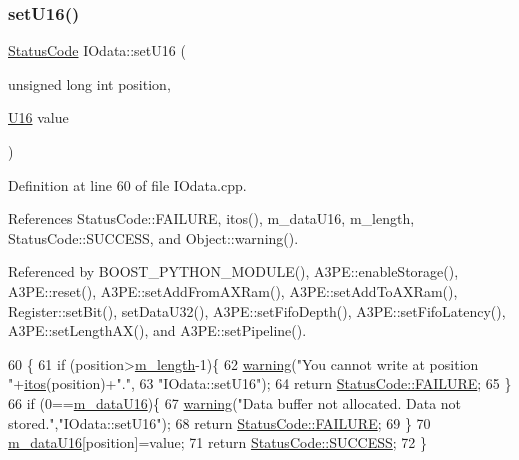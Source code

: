 \subsubsection{\texorpdfstring{set\+U16()}{setU16()}}
{\footnotesize\ttfamily \hyperlink{classStatusCode}{Status\+Code} I\+Odata\+::set\+U16 (\begin{DoxyParamCaption}\item[{unsigned long int}]{position,  }\item[{\hyperlink{classIOdata_a1eb45b348534a7c19a4a99b746e693ff}{U16}}]{value }\end{DoxyParamCaption})}



Definition at line 60 of file I\+Odata.\+cpp.



References Status\+Code\+::\+F\+A\+I\+L\+U\+RE, itos(), m\+\_\+data\+U16, m\+\_\+length, Status\+Code\+::\+S\+U\+C\+C\+E\+SS, and Object\+::warning().



Referenced by B\+O\+O\+S\+T\+\_\+\+P\+Y\+T\+H\+O\+N\+\_\+\+M\+O\+D\+U\+L\+E(), A3\+P\+E\+::enable\+Storage(), A3\+P\+E\+::reset(), A3\+P\+E\+::set\+Add\+From\+A\+X\+Ram(), A3\+P\+E\+::set\+Add\+To\+A\+X\+Ram(), Register\+::set\+Bit(), set\+Data\+U32(), A3\+P\+E\+::set\+Fifo\+Depth(), A3\+P\+E\+::set\+Fifo\+Latency(), A3\+P\+E\+::set\+Length\+A\+X(), and A3\+P\+E\+::set\+Pipeline().


\begin{DoxyCode}
60                                                               \{
61   \textcolor{keywordflow}{if} (position>\hyperlink{classIOdata_afabe57441da019eb614d277799106aac}{m\_length}-1)\{
62     \hyperlink{classObject_a65cd4fda577711660821fd2cd5a3b4c9}{warning}(\textcolor{stringliteral}{"You cannot write at position "}+\hyperlink{Tools_8h_af330027dbdafb9a30768b3613c553e60}{itos}(position)+\textcolor{stringliteral}{"."},
63         \textcolor{stringliteral}{"IOdata::setU16"});
64     \textcolor{keywordflow}{return} \hyperlink{classStatusCode_a6f565cbeadc76d14c72f047e5e85eb4ba3da73d4c469762eb9d3c960368252b26}{StatusCode::FAILURE};
65   \}
66   \textcolor{keywordflow}{if} (0==\hyperlink{classIOdata_a8d698e077b7898009691b9086a3e6453}{m\_dataU16})\{
67     \hyperlink{classObject_a65cd4fda577711660821fd2cd5a3b4c9}{warning}(\textcolor{stringliteral}{"Data buffer not allocated. Data not stored."},\textcolor{stringliteral}{"IOdata::setU16"});
68     \textcolor{keywordflow}{return} \hyperlink{classStatusCode_a6f565cbeadc76d14c72f047e5e85eb4ba3da73d4c469762eb9d3c960368252b26}{StatusCode::FAILURE};
69   \}
70   \hyperlink{classIOdata_a8d698e077b7898009691b9086a3e6453}{m\_dataU16}[position]=value;
71   \textcolor{keywordflow}{return} \hyperlink{classStatusCode_a6f565cbeadc76d14c72f047e5e85eb4badd0da38d3ba0d922efd1f4619bc37ad8}{StatusCode::SUCCESS};
72 \}
\end{DoxyCode}
\mbox{\label{classIOdata_abbed9a057203bc763f97b85fb385f36b}} 
